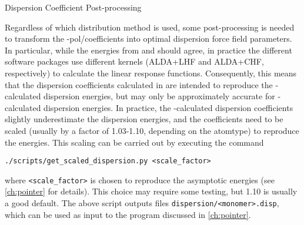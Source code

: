\begin{subsubsection}{Dispersion Coefficient Post-processing}
\label{sec:workflow-cn_postprocess}

Regardless of which distribution method is used, some post-processing is
needed to transform the \isa-pol/\idma coefficients into optimal dispersion
force field parameters. In particular, while the \dftsapt energies from
\molpro and \camcasp should agree, in practice the different software packages
use different kernels (ALDA+LHF and ALDA+CHF, respectively) to calculate the
linear response functions. Consequently, this means that the dispersion
coefficients calculated in \camcasp are intended to reproduce the \camcasp-calculated
\dftsapt dispersion energies, but may only be approximately accurate for
\molpro-calculated \dftsapt dispersion energies.\footnotemark{ } In practice, the
\camcasp-calculated dispersion coefficients slightly underestimate the \molpro
dispersion energies, and the coefficients need to be scaled (usually by a factor of 1.03-1.10,
depending on the atomtype) to reproduce the \molpro energies. This scaling can
be carried out by executing the command
%
\begin{lstlisting}
./scripts/get_scaled_dispersion.py <scale_factor>
\end{lstlisting}
%
where \verb|<scale_factor>| is chosen to reproduce the asymptotic \molpro
\dftsapt energies (see \cref{ch:pointer} for details). This choice may require some
testing, but 1.10 is usually a good default. The above script outputs files
\verb|dispersion/<monomer>.disp|, which can be used as input to the \pointer
program discussed in \cref{ch:pointer}.


\end{subsubsection}
